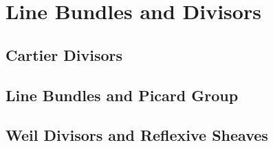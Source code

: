 \section{Line Bundles and Divisors}

\subsection{Cartier Divisors}

\subsection{Line Bundles and Picard Group}

\subsection{Weil Divisors and Reflexive Sheaves}
